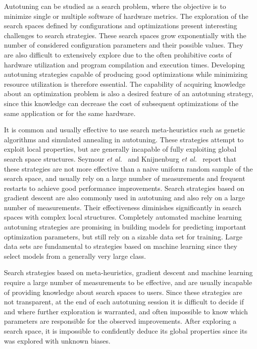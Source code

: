 \documentclass[conference]{IEEEtran}
\begin{document}
Autotuning can be studied as a search problem, where the objective is to
minimize single or multiple software of hardware metrics. The exploration of the
search spaces defined by configurations and optimizations present interesting
challenges to search strategies. These search spaces grow exponentially with the
number of considered configuration parameters and their possible values. They
are also difficult to extensively explore due to the often prohibitive costs of
hardware utilization and program compilation and execution times. Developing
autotuning strategies capable of producing good optimizations while minimizing
resource utilization is therefore essential. The capability of acquiring
knowledge about an optimization problem is also a desired feature of an
autotuning strategy, since this knowledge can decrease the cost of subsequent
optimizations of the same application or for the same hardware.

It is common and usually effective to use search meta-heuristics such as genetic
algorithms and simulated annealing in autotuning. These strategies attempt to
exploit local properties, but are generally incapable of fully exploiting global
search space structures. Seymour \emph{et al.}~\cite{seymour2008comparison} and
Knijnenburg \emph{et al.}~\cite{knijnenburg2003combined} report that these
strategies are not more effective than a naive uniform random sample of the
search space, and usually rely on a large number of measurements and frequent
restarts to achieve good performance improvements. Search strategies based on
gradient descent are also commonly used in autotuning and also rely on a large
number of measurements. Their effectiveness diminishes significantly in search
spaces with complex local structures. Completely automated machine learning
 autotuning strategies are promising in building models for predicting
important optimization parameters, but still rely on a sizable data set for
training. Large data sets are fundamental to strategies based on machine
learning since they select models from a generally very large class.

Search strategies based on meta-heuristics, gradient descent and machine
learning require a large number of measurements to be effective, and are usually
incapable of providing knowledge about search spaces to users. Since these
strategies are not transparent, at the end of each autotuning session it is
difficult to decide if and where further exploration is warranted, and
often impossible to know which parameters are responsible for the observed
improvements. After exploring a search space, it is impossible to confidently
deduce its global properties since its was explored with unknown biases.
\end{document}
